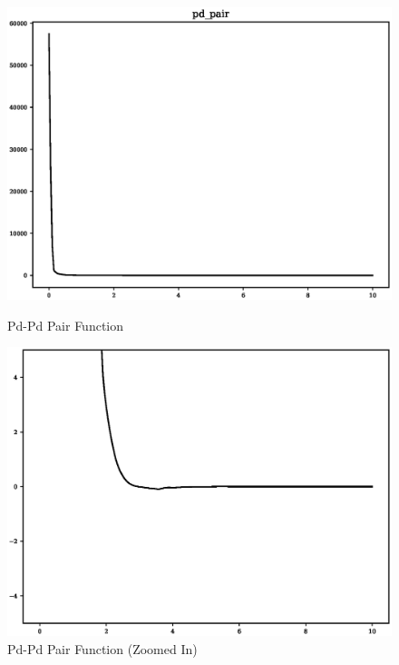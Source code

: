 \begin{figure}[ht] 
  \begin{minipage}[b]{0.4\linewidth}
    \centering
    \includegraphics[width=.9\linewidth]{chapters/results_potential_fitting/pot_fepd_fcc_1/pd_pair.eps} 
    \caption{Pd-Pd Pair Function}  
  \end{minipage}%
  \begin{minipage}[b]{0.4\linewidth}
    \centering
    \includegraphics[width=.9\linewidth]{chapters/results_potential_fitting/pot_fepd_fcc_1/pd_pair_zoom.eps} 
    \caption{Pd-Pd Pair Function (Zoomed In)} 
  \end{minipage} 
  \begin{minipage}[b]{0.4\linewidth}
    \centering

\end{minipage}
\end{figure}
